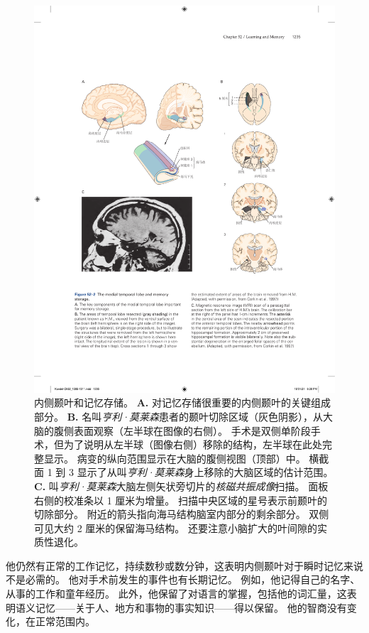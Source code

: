 \begin{figure}[htbp]
	\centering
	\includegraphics[width=0.9\linewidth]{chap52/fig_52_2}
	\caption{内侧颞叶和记忆存储。
		\textbf{A.} 对记忆存储很重要的内侧颞叶的关键组成部分。
		\textbf{B.} 名叫\textit{亨利·莫莱森}患者的颞叶切除区域（灰色阴影），从大脑的腹侧表面观察（左半球在图像的右侧）。
		手术是双侧单阶段手术，但为了说明从左半球（图像右侧）移除的结构，左半球在此处完整显示。
		病变的纵向范围显示在大脑的腹侧视图（顶部）中。
		横截面 1 到 3 显示了从叫\textit{亨利·莫莱森}身上移除的大脑区域的估计范围\cite{corkin1997hm}。
		\textbf{C.} 叫\textit{亨利·莫莱森}大脑左侧矢状旁切片的\textit{核磁共振成像}扫描。
		面板右侧的校准条以 1 厘米为增量。
		扫描中央区域的星号表示前颞叶的切除部分。
		附近的箭头指向海马结构脑室内部分的剩余部分。
		双侧可见大约 2 厘米的保留海马结构。
		还要注意小脑扩大的叶间隙的实质性退化\cite{corkin1997hm}。}
	\label{fig:52_2}
\end{figure}


他仍然有正常的工作记忆，持续数秒或数分钟，这表明内侧颞叶对于瞬时记忆来说不是必需的。
他对手术前发生的事件也有长期记忆。
例如，他记得自己的名字、从事的工作和童年经历。
此外，他保留了对语言的掌握，包括他的词汇量，这表明语义记忆——关于人、地方和事物的事实知识——得以保留。
他的智商没有变化，在正常范围内。


